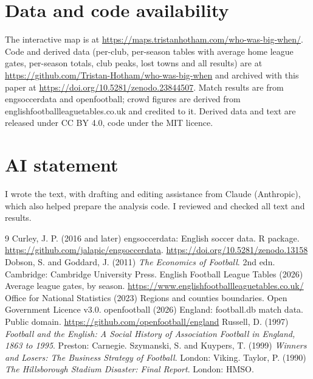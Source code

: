 \documentclass[11pt,a4paper]{article}
\begin{document}
\section*{Data and code availability}
The interactive map is at \url{https://maps.tristanhotham.com/who-was-big-when/}. Code and derived data (per-club, per-season tables with average home league gates, per-season totals, club peaks, lost towns and all results) are at \url{https://github.com/Tristan-Hotham/who-was-big-when} and archived with this paper at \url{https://doi.org/10.5281/zenodo.23844507}. Match results are from engsoccerdata and openfootball; crowd figures are derived from englishfootballleaguetables.co.uk and credited to it. Derived data and text are released under CC BY 4.0, code under the MIT licence.

\section*{AI statement}
I wrote the text, with drafting and editing assistance from Claude (Anthropic), which also helped prepare the analysis code. I reviewed and checked all text and results.

\begin{thebibliography}{9}
 Curley, J. P. (2016 and later) engsoccerdata: English soccer data. R package. \url{https://github.com/jalapic/engsoccerdata}. \url{https://doi.org/10.5281/zenodo.13158}
 Dobson, S. and Goddard, J. (2011) \emph{The Economics of Football}. 2nd edn. Cambridge: Cambridge University Press.
 English Football League Tables (2026) Average league gates, by season. \url{https://www.englishfootballleaguetables.co.uk/}
 Office for National Statistics (2023) Regions and counties boundaries. Open Government Licence v3.0.
 openfootball (2026) England: football.db match data. Public domain. \url{https://github.com/openfootball/england}
 Russell, D. (1997) \emph{Football and the English: A Social History of Association Football in England, 1863 to 1995}. Preston: Carnegie.
 Szymanski, S. and Kuypers, T. (1999) \emph{Winners and Losers: The Business Strategy of Football}. London: Viking.
 Taylor, P. (1990) \emph{The Hillsborough Stadium Disaster: Final Report}. London: HMSO.
\end{thebibliography}
\end{document}
